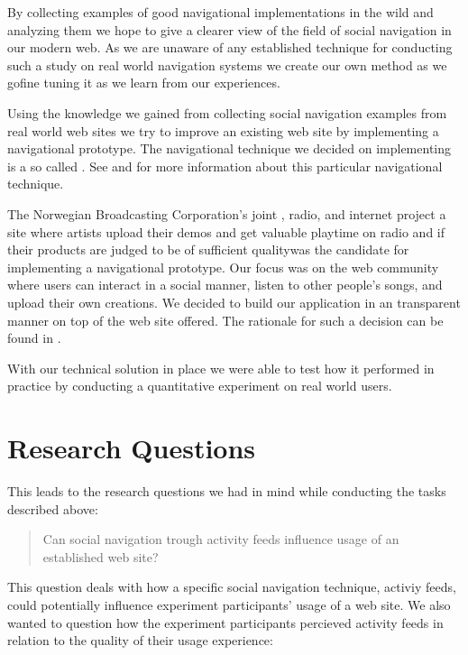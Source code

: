 By collecting examples of good navigational implementations in the wild
and analyzing them we hope to give a clearer
view of the field of social navigation in our modern web.
As we are unaware of any established technique for
conducting such a study on real world navigation systems we create our own
method as we go\dash{}fine tuning it as we learn from our experiences.

Using the knowledge we gained from collecting social navigation examples
from real world web sites we try to improve an existing web site by
implementing a navigational prototype. The navigational technique we
decided on implementing is a so called . See
 and
for more information about this particular navigational technique.

The Norwegian Broadcasting Corporation's joint
, radio, and internet project \project{\urort{}}\dash{}a site where
artists upload their demos and get valuable playtime on radio and  if
their products are judged to be of sufficient quality\dash{}was
the candidate for implementing a navigational prototype.
Our focus was on the \urort{} web community%
where users can interact in a social manner, listen to other people's songs,
and upload their own creations.
We decided to build our application in an transparent manner on top of the
web site \urort{} offered. The rationale for such a decision can be found in
.

With our technical solution in place we were able to test how it performed in
practice by conducting a quantitative experiment on real world users.

\section{Research Questions}

This leads to the research questions we had in mind while conducting
the tasks described above:

\begin{quote}
  Can social navigation trough activity feeds influence
  usage of an established web site?
\end{quote}

This question deals with how a specific social navigation technique, activiy
feeds, could potentially influence experiment participants' usage of a web
site. We also wanted to question how the experiment participants percieved
activity feeds in relation to the quality of their usage experience:

